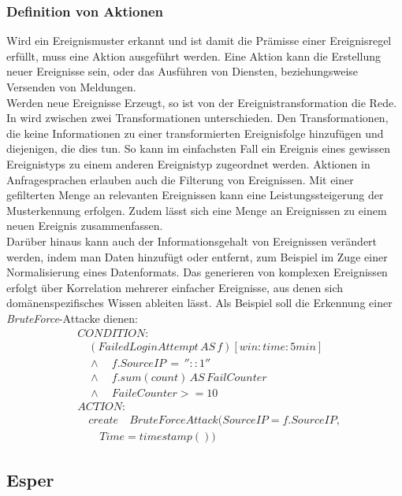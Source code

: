 \documentclass{acm_proc_article-sp}
\begin{document}
\subsubsection{Definition von Aktionen}
\vspace{0.1cm}
Wird ein Ereignismuster erkannt und ist damit die Prämisse einer Ereignisregel erfüllt, 
muss eine Aktion ausgeführt werden. Eine Aktion kann die Erstellung neuer Ereignisse 
sein, oder das Ausführen von Diensten, beziehungsweise Versenden von Meldungen.\\
Werden neue Ereignisse Erzeugt, so ist von der Ereignistransformation die Rede. In 
\cite{bruns} wird zwischen zwei Transformationen unterschieden. Den Transformationen, die 
keine Informationen zu einer transformierten Ereignisfolge hinzufügen und diejenigen, die 
dies tun. So kann im einfachsten Fall ein Ereignis eines gewissen Ereignistyps zu einem 
anderen Ereignistyp zugeordnet werden. Aktionen in Anfragesprachen erlauben auch die 
Filterung von Ereignissen. Mit einer gefilterten Menge an relevanten Ereignissen kann 
eine Leistungssteigerung der Musterkennung erfolgen. Zudem lässt sich eine Menge an 
Ereignissen zu einem neuen Ereignis zusammenfassen.\\
Darüber hinaus kann auch der Informationsgehalt von Ereignissen verändert werden, indem 
man Daten hinzufügt oder entfernt, zum Beispiel im Zuge einer Normalisierung eines 
Datenformats. Das generieren von komplexen Ereignissen erfolgt über Korrelation mehrerer 
einfacher Ereignisse, aus denen sich domänenspezifisches Wissen ableiten lässt. Als 
Beispiel soll die Erkennung einer \textit{BruteForce}-Attacke dienen:
\begin{align*}
&CONDITION:\\
&\quad (FailedLoginAttempt\, AS\, f)[win:time:5min]\\
&\quad \land\quad f.SourceIP\, =\, ''::1'' \\
&\quad \land\quad f.sum(count)\, AS\, FailCounter\\
&\quad \land\quad FaileCounter >= 10\\
&ACTION:\\
&\quad create \quad BruteForceAttack(SourceIP = f.SourceIP,\\
&\quad \quad Time=timestamp())
\end{align*}

%
%
\subsection{Esper}\label{kap:esper} 
\vspace{0.1cm}
\end{document}
